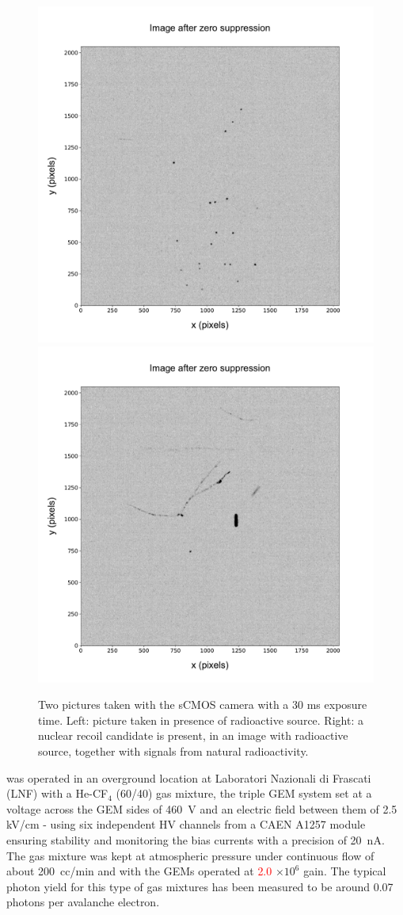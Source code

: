 \documentclass[12pt]{iopart}
\begin{document}
 
\begin{figure}[ht]
  \begin{center}
    \includegraphics[width=0.49\linewidth]{figures/pic_run01843_ev93_oriIma_paper}
    \includegraphics[width=0.49\linewidth]{figures/pic_run02317_ev342_oriIma_paper}
    \caption{Two pictures taken with the sCMOS camera with a 30 ms
      exposure time. Left: picture taken in presence of \fe radioactive
      source. Right: a nuclear recoil candidate is present, in an image
      with \ambe radioactive source, together with signals from natural
      radioactivity.      \label{fig:signals}}
  \end{center}
\end{figure}

\lemon was operated in an overground location at Laboratori Nazionali di Frascati (LNF) with  a He-CF$_4$ (60/40) gas mixture, the triple GEM system set at a voltage across the GEM sides of {460~V} and an electric field between them of {2.5} kV/cm - using 
six independent HV channels from a CAEN A1257 module
ensuring stability and monitoring the bias currents with a precision of 20~nA. The gas mixture was kept at atmospheric pressure under continuous flow of about 200~cc/min and with the GEMs operated at \textcolor{red}{2.0} $ \times10^6$ gain. The typical photon yield for this  type of gas mixtures has been measured to be around 0.07 photons per avalanche electron\cite{bib:jinst_orange1, bib:roby, bib:tesinatalia}.
\end{document}
